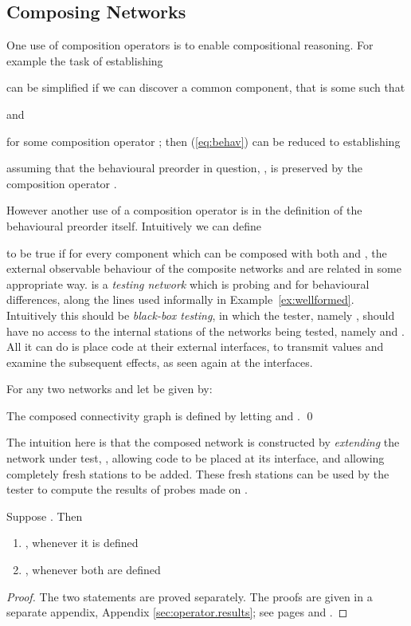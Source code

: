 \documentclass{LMCS}
\begin{document}
\subsection{Composing Networks}
\label{sec:comp.net}
One use of composition operators is to enable compositional reasoning. For example the task of establishing

can be simplified if we can discover a common component, that is some  such that 

and 

for some composition operator ; then (\ref{eq:behav}) can be reduced to establishing 

assuming that the behavioural preorder in question, , is preserved by the composition operator . 

However another use of a composition operator is in the definition of the behavioural preorder  itself.
Intuitively we can define 

to be true if for every component  which can be composed
with both  and , the external
observable behaviour of the composite networks  and  are related in some appropriate way. 
is a \emph{testing network} which is probing  and
 for behavioural differences, along the lines used informally in 
Example~\ref{ex:wellformed}.  Intuitively this should
be \emph{black-box testing}, in which the tester, namely ,
should have no access to the internal stations of the networks being
tested, namely  and . All it can do is
place code at their external interfaces,  to transmit values and
examine the subsequent effects, as seen again at the interfaces.  

\begin{defi}\label{def:comp.nets}
For any two networks  and 
let  be given by:

The composed connectivity graph  
is defined by letting  and  .
\qed 
\end{defi}
\noindent
The intuition here is that the composed network 
is constructed by \emph{extending} the network under test, ,
allowing code to be placed at its interface, and allowing completely
fresh stations to be added. These fresh stations can be used by the
tester to compute the results of probes made on . 

\begin{prop}
\label{prop:testp.assoc}
Suppose . 
Then 
\begin{enumerate}
\item , whenever it is defined 

\item , whenever both are defined 
\end{enumerate}
\end{prop} 
\begin{proof}
The two statements are proved separately. The proofs are given 
in a  separate appendix, Appendix \ref{sec:operator.results}; 
see pages \pageref{proof:testP.closed} and \pageref{proof:testP.assoc}.
\end{proof}
\end{document}
